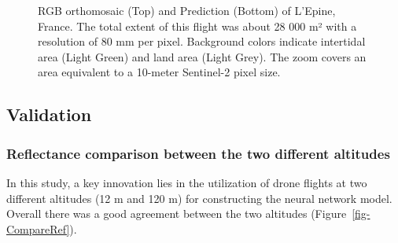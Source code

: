 \documentclass[
  number]{elsarticle}
\begin{document}
\label{cell-fig-Dike}
\begin{figure}[H]


\caption{\label{fig-Dike}RGB orthomosaic (Top) and Prediction (Bottom)
of L'Epine, France. The total extent of this flight was about 28 000 m²
with a resolution of 80 mm per pixel. Background colors indicate
intertidal area (Light Green) and land area (Light Grey). The zoom
covers an area equivalent to a 10-meter Sentinel-2 pixel size.}

\end{figure}%

\subsection{Validation}\label{validation-1}

\subsubsection{Reflectance comparison between the two different
altitudes}\label{reflectance-comparison-between-the-two-different-altitudes}

In this study, a key innovation lies in the utilization of drone flights
at two different altitudes (12 m and 120 m) for constructing the neural
network model. Overall there was a good agreement between the two
altitudes (Figure~\ref{fig-CompareRef}).
\end{document}
